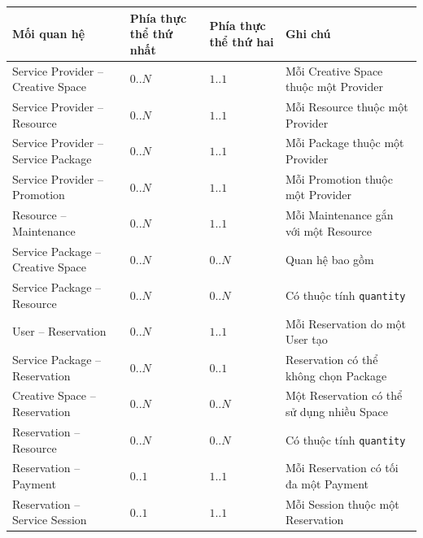 \begin{center}

\scriptsize

\begin{tabular}{p{.20\linewidth} p{.18\linewidth} p{.18\linewidth} p{.24\linewidth}}

\toprule

Mối quan hệ & Phía thực thể thứ nhất & Phía thực thể thứ hai & Ghi chú \\

\midrule

Service Provider -- Creative Space & $0..N$ & $1..1$ & Mỗi Creative Space thuộc một Provider \\

Service Provider -- Resource & $0..N$ & $1..1$ & Mỗi Resource thuộc một Provider \\

Service Provider -- Service Package & $0..N$ & $1..1$ & Mỗi Package thuộc một Provider \\

Service Provider -- Promotion & $0..N$ & $1..1$ & Mỗi Promotion thuộc một Provider \\

Resource -- Maintenance & $0..N$ & $1..1$ & Mỗi Maintenance gắn với một Resource \\

Service Package -- Creative Space & $0..N$ & $0..N$ & Quan hệ bao gồm \\

Service Package -- Resource & $0..N$ & $0..N$ & Có thuộc tính \texttt{quantity} \\

User -- Reservation & $0..N$ & $1..1$ & Mỗi Reservation do một User tạo \\

Service Package -- Reservation & $0..N$ & $0..1$ & Reservation có thể không chọn Package \\

Creative Space -- Reservation & $0..N$ & $0..N$ & Một Reservation có thể sử dụng nhiều Space \\

Reservation -- Resource & $0..N$ & $0..N$ & Có thuộc tính \texttt{quantity} \\

Reservation -- Payment & $0..1$ & $1..1$ & Mỗi Reservation có tối đa một Payment \\

Reservation -- Service Session & $0..1$ & $1..1$ & Mỗi Session thuộc một Reservation \\


\end{tabular}
\end{center}
